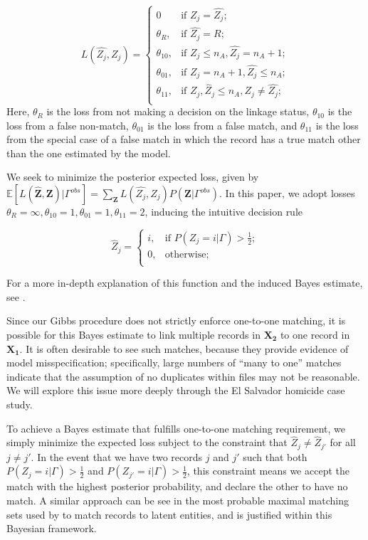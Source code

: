 \documentclass[12pt,letterpaper]{article}
\newcommand{\1}[1]{\mathbb{I}\!\left[#1\right]} %
\begin{document}
\[L(\hat{Z_j}, Z_j)=\begin{cases} 
	0  & \text{if } Z_j = \hat{Z_j}; \\
	\theta_R,  & \text{if } \hat{Z_j} = R; \\
	\theta_{10},  & \text{if } Z_j \leq n_A,\hat{Z_j} = n_A + 1 ; \\
	\theta_{01},  & \text{if } Z_j = n_A + 1,\hat{Z_j} \leq n_A ; \\
	\theta_{11},  & \text{if } Z_j, \hat{Z}_j \leq n_A, Z_j \neq \hat{Z_j} ; \\
\end{cases}\] Here, \(\theta_R\) is the loss from not making a decision
on the linkage status, \(\theta_{10}\) is the loss from a false
non-match, \(\theta_{01}\) is the loss from a false match, and
\(\theta_{11}\) is the loss from the special case of a false match in
which the record has a true match other than the one estimated by the
model. 

We seek to minimize the posterior expected loss, given by $\mathbb{E}[L(\hat{\mathbf{Z}}, \mathbf{Z})|\Gamma^{obs}] = \sum_{\mathbf{Z}} L(\hat{Z_j}, Z_j)P(\mathbf{Z}|\Gamma^{obs})$. In this paper, we adopt losses
\(\theta_R = \infty, \theta_{10} = 1, \theta_{01} = 1, \theta_{11} = 2\), inducing the intuitive decision rule

\[\hat{Z}_j =\begin{cases} 
	i,  & \text{if } P(Z_j = i |\Gamma) > \frac{1}{2}; \\
	0,  & \text{otherwise} ; \\
\end{cases}\]

For a more in-depth explanation of this function and the induced Bayes
estimate, see \citep{sadinle_bayesian_2017}.

Since our Gibbs procedure does not strictly enforce one-to-one matching, it is possible for this Bayes estimate to link multiple records in $\bm{X_2}$ to one record in $\bm{X_1}$. It is often desirable to see such matches, because they provide evidence of model misspecification; specifically, large numbers of ``many to one'' matches indicate that the assumption of no duplicates within files may not be reasonable. We will explore this issue more deeply through the El Salvador homicide case study. 

To achieve a Bayes estimate that fulfills one-to-one matching requirement, we simply minimize the expected loss subject to the constraint that $\hat{Z}_j \neq \hat{Z}_{j'}$ for all $j \neq j'$. In the event that we have two records $j$ and $j'$ such that both $P(Z_j = i |\Gamma) > \frac{1}{2}$ and $ P(Z_{j'} = i |\Gamma) > \frac{1}{2}$, this constraint means we accept the match with the highest posterior probability, and declare the other to have no match.  A similar approach can be see in the most probable maximal matching sets used by \citep{steorts_2013} to match records to latent entities, and is justified within this Bayesian framework.
\end{document}
